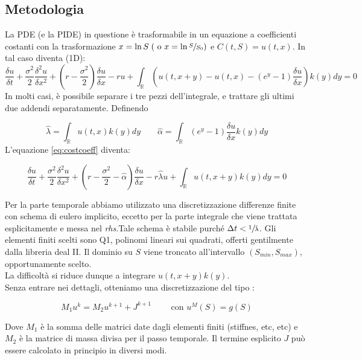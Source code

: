 \documentclass[a4paper,10pt]{article}
\newcommand{\der}[2]{\frac{\delta #1}{\delta #2}}
\newcommand{\dder}[2]{\frac{\delta^2 #1}{\delta #2^2}}
\begin{document}
\subsection{Metodologia}

La PDE (e la PIDE) in questione è trasformabile in un equazione a coefficienti costanti con la trasformazione $x=\ln{S} \; (\text{ o } x=\ln{\sfrac{S}{S_0}})$ e $C(t,S)=u(t,x)$. In tal caso diventa (1D):
{
\small
\begin{equation}
 \der{u}{t}+\frac{\sigma^2}{2}\dder{u}{x}+\left(r-\frac{\sigma^2}{2}\right)\der{u}{x}-ru+\int_\mathbb{R}\left( u(t,x+y)-u(t,x)-(e^y-1)\der{u}{x}\right)k(y)dy=0
\label{eq:costcoeff}
 \end{equation}
\normalsize
}
In molti casi, è possibile separare i tre pezzi dell'integrale, e trattare gli ultimi due addendi separatamente. Definendo 

\begin{equation*}
 \hat{\lambda}=\int_\mathbb{R}u(t,x)k(y)dy \qquad \hat{\alpha}=\int_\mathbb{R}(e^y-1)\der{u}{x}k(y)dy
\end{equation*}
L'equazione \eqref{eq:costcoeff} diventa: 

{

\begin{equation}
 \der{u}{t}+\frac{\sigma^2}{2}\dder{u}{x}+\left(r-\frac{\sigma^2}{2}-\hat{\alpha}\right)\der{u}{x}-r\hat{\lambda}u+\int_\mathbb{R}u(t,x+y)k(y)dy=0
\end{equation}
}

Per la parte temporale abbiamo utilizzato una discretizzazione differenze finite con schema di eulero implicito, eccetto per la parte integrale che viene trattata esplicitamente e messa nel \emph{rhs}.Tale schema è stabile purché $\Delta t < \sfrac{1}{\hat{\lambda}}$. Gli elementi finiti scelti sono Q1, polinomi lineari sui quadrati, offerti gentilmente dalla libreria deal II. Il dominio su $S$ viene troncato all'intervallo $(S_{min},S_{max})$, opportunamente scelto. 
\\
La difficoltà si riduce dunque a integrare $u(t,x+y)k(y)$.
\\
Senza entrare nei dettagli, otteniamo una discretizzazione del tipo :

\begin{equation}
 M_1u^k=M_2u^{k+1}+J^{k+1} \qquad \text{ con } u^{M}(S)=g(S) 
\end{equation}

Dove $M_1$ è la somma delle matrici date dagli elementi finiti (stiffnes, etc, etc) e $M_2$ è la matrice di massa divisa per il passo temporale. Il termine esplicito $J$ può essere calcolato in principio in diversi modi.
\end{document}
